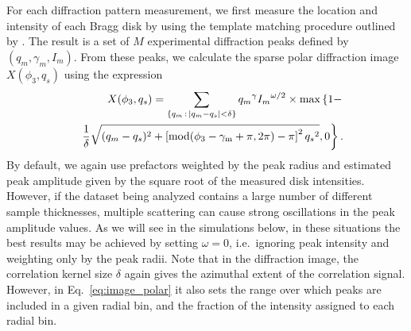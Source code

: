 \documentclass[%
 superscriptaddress,
 aip,
 amsmath,amssymb,
reprint,%
 author-year,%
longbibliography
]{revtex4-2}
\begin{document}
For each diffraction pattern measurement, we first measure the location and intensity of each Bragg disk by using the template matching procedure outlined by \cite{savitzky2021py4dstem}. The result is a set of $M$ experimental diffraction peaks defined by $(q_m,\gamma_m ,I_m)$. From these peaks, we calculate the sparse polar diffraction image $X(\phi_3, q_s)$ using the expression
\begin{eqnarray}
 \label{eq:image_polar}
    && X(\phi_3, q_s) = 
    \sum_{\{ q_m \,: \, |q_m - q_s| < \delta \}} 
    {q_m}^\gamma {I_m}^{\omega/2} \times
    \rm{max} \left\{
        1 - \right. 
    \\ %
    &&
        \left. \frac{1}{\delta} \sqrt{
        (q_m - q_s)^2 + 
        \left[
        \rm{mod}(
        \phi_3 - \gamma_m + \pi, 2 \pi) - \pi
        \right]^2 {q_s}^2
        }, 0
    \right\}.
    \nonumber 
\end{eqnarray}
By default, we again use prefactors weighted by the peak radius and estimated peak amplitude given by the square root of the measured disk intensities.  However, if the dataset being analyzed contains a large number of different sample thicknesses, multiple scattering can cause strong oscillations in the peak amplitude values. As we will see in the simulations below, in these situations the best results may be achieved by setting $\omega=0$, i.e.\ ignoring peak intensity and weighting only by the peak radii. Note that in the diffraction image, the correlation kernel size $\delta$ again gives the azimuthal extent of the correlation signal. However, in Eq.~\ref{eq:image_polar} it also sets the range over which peaks are included in a given radial bin, and the fraction of the intensity assigned to each radial bin. 
\end{document}
